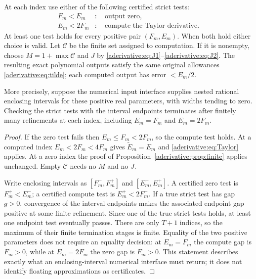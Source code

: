 \documentclass[11pt]{article}
\begin{document}
\begin{aderivativeproposition}\label{aderivative:prop:overlap}
At each index use either of the following certified strict tests:
\begin{align}
F_m<E_m&:\quad\text{output zero},\label{aderivative:eq:zerotest}\\
E_m<2F_m&:\quad\text{compute the Taylor derivative}.
\label{aderivative:eq:computetest}
\end{align}
At least one test holds for every positive pair $(F_m,E_m)$.
When both hold either choice is valid. Let $\mathcal C$ be
the finite set assigned to computation. If it is nonempty,
choose $M=1+\max\mathcal C$ and $J$ by
\eqref{aderivative:eq:J1}--\eqref{aderivative:eq:J2}. The resulting exact polynomial
outputs satisfy the same original allowances
\eqref{aderivative:eq:tilde}; each computed output has error $<E_m/2$.

More precisely, suppose the numerical input interface supplies
nested rational enclosing intervals for these positive real
parameters, with widths tending to zero. Checking the strict
tests with the interval endpoints terminates after finitely
many refinements at each index, including $E_m=F_m$ and
$E_m=2F_m$.
\end{aderivativeproposition}
\begin{proof}
If the zero test fails then $E_m\le F_m<2F_m$, so the compute
test holds. At a computed index $E_m<2F_m<4F_m$ gives
$\widetilde E_m=E_m$ and \eqref{aderivative:eq:Taylor} applies.
At a zero index the proof of Proposition~\ref{aderivative:prop:finite}
applies unchanged. Empty $\mathcal C$ needs no $M$ and no $J$.

Write enclosing intervals as $[F_m^-,F_m^+]$ and
$[E_m^-,E_m^+]$. A certified zero test is $F_m^+<E_m^-$;
a certified compute test is $E_m^+<2F_m^-$. If a true
strict test has gap $g>0$, convergence of the interval
endpoints makes the associated endpoint gap positive at
some finite refinement. Since one of the true strict
tests holds, at least one endpoint test eventually passes.
There are only $T+1$ indices, so the maximum of their finite
termination stages is finite. Equality of the two positive
parameters does not require an equality decision: at
$E_m=F_m$ the compute gap is $F_m>0$, while at $E_m=2F_m$
the zero gap is $F_m>0$. This statement describes exactly
what an enclosing-interval numerical interface must return;
it does not identify floating approximations as certificates.
\end{proof}
\end{document}
